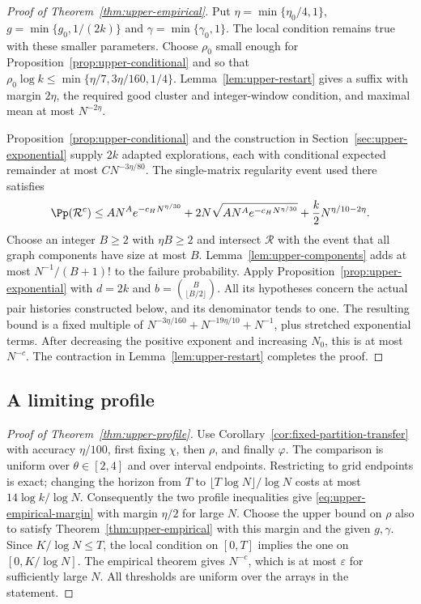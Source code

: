 
\begin{proof}[Proof of Theorem~\ref{thm:upper-empirical}]
Put $\eta=\min\{\eta_0/4,1\}$,
$g=\min\{g_0,1/(2k)\}$ and $\gamma=\min\{\gamma_0,1\}$.
The local condition remains true with these smaller parameters.
Choose $\rho_0$ small enough for Proposition~\ref{prop:upper-conditional}
and so that $\rho_0\log k\le\min\{\eta/7,3\eta/160,1/4\}$.
Lemma~\ref{lem:upper-restart} gives a suffix with margin $2\eta$,
the required good cluster and integer-window condition, and maximal
mean at most $N^{-2\eta}$.

Proposition~\ref{prop:upper-conditional} and the construction in
Section~\ref{sec:upper-exponential} supply $2k$ adapted explorations,
each with conditional expected remainder at most $CN^{-3\eta/80}$.
The single-matrix regularity event used there satisfies
\[
 \Pp(\mathcal R^c)\le
 AN^A e^{-c_H N^{\eta/30}}
 +2N\sqrt{AN^A e^{-c_H N^{\eta/30}}}
 +\frac{k}{2}N^{\eta/10-2\eta}.
\]
Choose an integer $B\ge2$ with $\eta B\ge2$ and intersect
$\mathcal R$ with the event that all graph components have size at
most $B$. Lemma~\ref{lem:upper-components} adds at most
$N^{-1}/(B+1)!$ to the failure probability. Apply
Proposition~\ref{prop:upper-exponential} with $d=2k$ and
$b=\binom B{\lfloor B/2\rfloor}$. All its hypotheses concern the
actual pair histories constructed below, and its denominator tends
to one. The resulting bound is a fixed multiple of
$N^{-3\eta/160}+N^{-19\eta/10}+N^{-1}$, plus stretched exponential
terms. After decreasing the positive exponent and increasing $N_0$,
this is at most $N^{-c}$. The contraction in
Lemma~\ref{lem:upper-restart} completes the proof.
\end{proof}

\subsection{A limiting profile}

\begin{proof}[Proof of Theorem~\ref{thm:upper-profile}]
Use Corollary~\ref{cor:fixed-partition-transfer} with accuracy
$\eta/100$, first fixing $\chi$, then $\rho$, and finally $\varphi$.
The comparison is uniform over $\theta\in[2,4]$ and over interval
endpoints. Restricting to grid endpoints is exact; changing the
horizon from $T$ to $\lfloor T\log N\rfloor/\log N$ costs at most
$14\log k/\log N$. Consequently the two profile inequalities
give \eqref{eq:upper-empirical-margin} with margin $\eta/2$ for large
$N$. Choose the upper bound on $\rho$ also to satisfy
Theorem~\ref{thm:upper-empirical} with this margin and the given
$g,\gamma$. Since $K/\log N\le T$, the local condition on $[0,T]$
implies the one on $[0,K/\log N]$. The empirical theorem gives
$N^{-c}$, which is at most $\varepsilon$ for sufficiently large $N$.
All thresholds are uniform over the arrays in the statement.
\end{proof}

